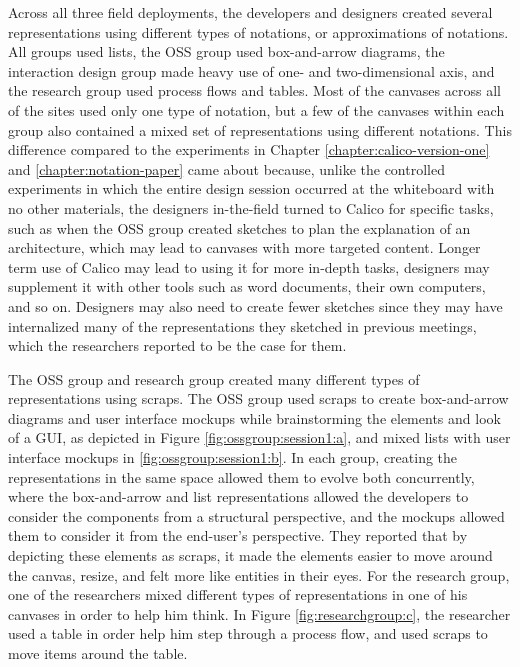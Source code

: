 Across all three field deployments, the developers and designers created several representations using different types of notations, or approximations of notations. All groups used lists, the OSS group used box-and-arrow diagrams, the interaction design group made heavy use of one- and two-dimensional axis, and the research group used process flows and tables. Most of the canvases across all of the sites used only one type of notation, but a few of the canvases within each group also contained a mixed set of representations using different notations. This difference compared to the experiments in Chapter \ref{chapter:calico-version-one} and \ref{chapter:notation-paper} came about because, unlike the controlled experiments in which the entire design session occurred at the whiteboard with no other materials, the designers in-the-field turned to Calico for specific tasks, such as when the OSS group created sketches to plan the explanation of an architecture, which may lead to canvases with more targeted content. Longer term use of Calico may lead to using it for more in-depth tasks, designers may supplement it with other tools such as word documents, their own computers, and so on. Designers may also need to create fewer sketches since they may have internalized many of the representations they sketched in previous meetings, which the researchers reported to be the case for them.

The OSS group and research group created many different types of representations using scraps. The OSS group used scraps to create box-and-arrow diagrams and user interface mockups while brainstorming the elements and look of a GUI, as depicted in Figure \ref{fig:ossgroup:session1:a}, and mixed lists with user interface mockups in \ref{fig:ossgroup:session1:b}. In each group, creating the representations in the same space allowed them to evolve both concurrently, where the box-and-arrow and list representations allowed the developers to consider the components from a structural perspective, and the mockups allowed them to consider it from the end-user's perspective. They reported that by depicting these elements as scraps, it made the elements easier to move around the canvas, resize, and felt more like entities in their eyes. For the research group, one of the researchers mixed different types of representations in one of his canvases in order to help him think. In Figure \ref{fig:researchgroup:c}, the researcher used a table in order help him step through a process flow, and used scraps to move items around the table.

